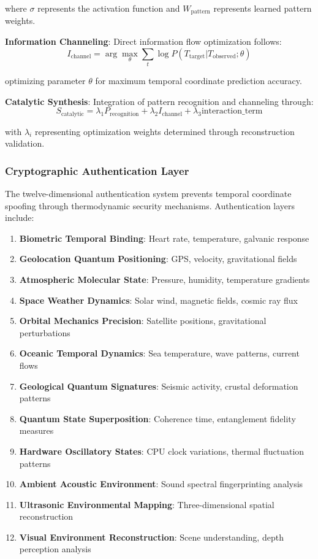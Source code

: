 \documentclass[12pt,a4paper]{article}
\begin{document}
where $\sigma$ represents the activation function and $W_{\text{pattern}}$ represents learned pattern weights.

\textbf{Information Channeling}: Direct information flow optimization follows:
$$I_{\text{channel}} = \arg\max_\theta \sum_t \log P(T_{\text{target}}|T_{\text{observed}}; \theta)$$

optimizing parameter $\theta$ for maximum temporal coordinate prediction accuracy.

\textbf{Catalytic Synthesis}: Integration of pattern recognition and channeling through:
$$S_{\text{catalytic}} = \lambda_1 P_{\text{recognition}} + \lambda_2 I_{\text{channel}} + \lambda_3 \text{interaction\_term}$$

with $\lambda_i$ representing optimization weights determined through reconstruction validation.

\subsubsection{Cryptographic Authentication Layer}

The twelve-dimensional authentication system prevents temporal coordinate spoofing through thermodynamic security mechanisms. Authentication layers include:

\begin{enumerate}
\item \textbf{Biometric Temporal Binding}: Heart rate, temperature, galvanic response
\item \textbf{Geolocation Quantum Positioning}: GPS, velocity, gravitational fields
\item \textbf{Atmospheric Molecular State}: Pressure, humidity, temperature gradients
\item \textbf{Space Weather Dynamics}: Solar wind, magnetic fields, cosmic ray flux
\item \textbf{Orbital Mechanics Precision}: Satellite positions, gravitational perturbations
\item \textbf{Oceanic Temporal Dynamics}: Sea temperature, wave patterns, current flows
\item \textbf{Geological Quantum Signatures}: Seismic activity, crustal deformation patterns
\item \textbf{Quantum State Superposition}: Coherence time, entanglement fidelity measures
\item \textbf{Hardware Oscillatory States}: CPU clock variations, thermal fluctuation patterns
\item \textbf{Ambient Acoustic Environment}: Sound spectral fingerprinting analysis
\item \textbf{Ultrasonic Environmental Mapping}: Three-dimensional spatial reconstruction
\item \textbf{Visual Environment Reconstruction}: Scene understanding, depth perception analysis
\end{enumerate}
\end{document}
